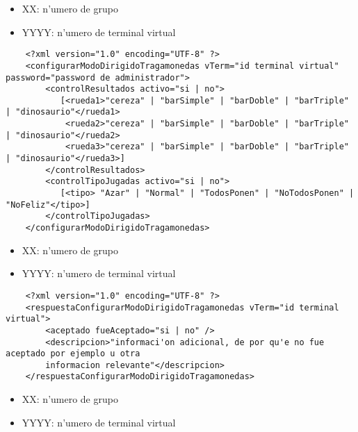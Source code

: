  
\begin{itemize}
    \item{XX: n'umero de grupo}
    \item{YYYY: n'umero de terminal virtual}
\end{itemize}

\begin{verbatim}
    <?xml version="1.0" encoding="UTF-8" ?>
    <configurarModoDirigidoTragamonedas vTerm="id terminal virtual" password="password de administrador">
        <controlResultados activo="si | no">
           [<rueda1>"cereza" | "barSimple" | "barDoble" | "barTriple" | "dinosaurio"</rueda1>
            <rueda2>"cereza" | "barSimple" | "barDoble" | "barTriple" | "dinosaurio"</rueda2>
            <rueda3>"cereza" | "barSimple" | "barDoble" | "barTriple" | "dinosaurio"</rueda3>]
        </controlResultados>
        <controlTipoJugadas activo="si | no">
           [<tipo> "Azar" | "Normal" | "TodosPonen" | "NoTodosPonen" | "NoFeliz"</tipo>]
        </controlTipoJugadas>
    </configurarModoDirigidoTragamonedas>
\end{verbatim}


 
\begin{itemize}
    \item{XX: n'umero de grupo}
    \item{YYYY: n'umero de terminal virtual}
\end{itemize}

\begin{verbatim}
    <?xml version="1.0" encoding="UTF-8" ?>
    <respuestaConfigurarModoDirigidoTragamonedas vTerm="id terminal virtual">
        <aceptado fueAceptado="si | no" />
        <descripcion>"informaci'on adicional, de por qu'e no fue aceptado por ejemplo u otra
        informacion relevante"</descripcion>
    </respuestaConfigurarModoDirigidoTragamonedas>
\end{verbatim}


 
\begin{itemize}
    \item{XX: n'umero de grupo}
    \item{YYYY: n'umero de terminal virtual}
\end{itemize}

